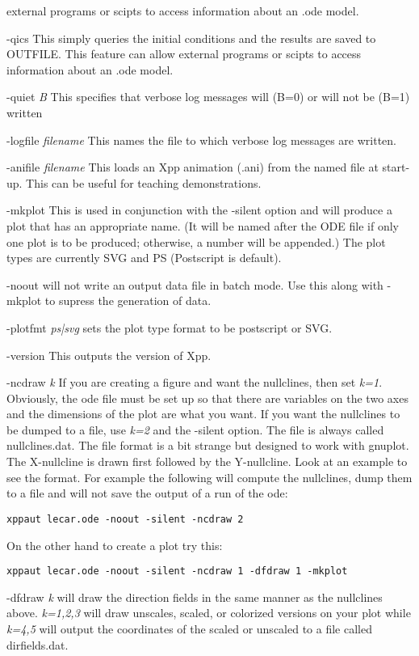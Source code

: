 \begin{description}
external programs or scipts to access information about an .ode model.
\item{-qics} This simply queries the initial conditions and the results are saved to OUTFILE.  This feature can allow 
external programs or scipts to access information about an .ode model.          
 \item{-quiet \emph{B}}  This specifies that verbose log messages will (B=0) or will not be (B=1) written
\item{-logfile \emph{filename}} This names the file to which verbose log messages are written. 
\item{-anifile \emph{filename}} This loads an Xpp animation (.ani) from the named file at start-up.  This can be useful for
teaching demonstrations.
\item{-mkplot} This is used in conjunction with the -silent option and will produce a plot that has an appropriate name. (It will be named after the ODE file if only one plot is to be produced; otherwise, a number will be appended.) The plot types are currently SVG and PS (Postscript is default).
\item {-noout} will not write an output data file in batch mode. Use this along with -mkplot to supress the generation of data.
\item {-plotfmt} \emph{ps|svg} sets the plot type format to be  postscript or SVG.
\item{-version} This outputs the version of Xpp.
\item {-ncdraw \emph{k}} If you are creating a figure and want the nullclines, then set {\em k=1}. Obviously, the ode file must be set up so that there are variables on the two axes and the dimensions of the plot are what you want.  If you want the nullclines to be dumped to a file, use {\em k=2} and the {\ttfamily -silent} option.  The file is always called {\ttfamily nullclines.dat}. The file format is a bit strange but designed to work with gnuplot. The X-nullcline is drawn first followed by the Y-nullcline. Look at an example to see the format. For example the following will compute the nullclines, dump them to a file and will not save the output of a run of the ode:
\begin{verbatim}
xppaut lecar.ode -noout -silent -ncdraw 2
\end{verbatim}  
On the other hand to create a plot try this:
\begin{verbatim}
xppaut lecar.ode -noout -silent -ncdraw 1 -dfdraw 1 -mkplot 
\end{verbatim}
\item {-dfdraw \emph{k}} will draw the direction fields in the same manner as the nullclines above. \emph{k=1,2,3} will draw unscales, scaled, or colorized versions on your plot  while \emph{k=4,5} will output the coordinates of the scaled or unscaled to a file called {\ttfamily dirfields.dat}. 

\end{description}
